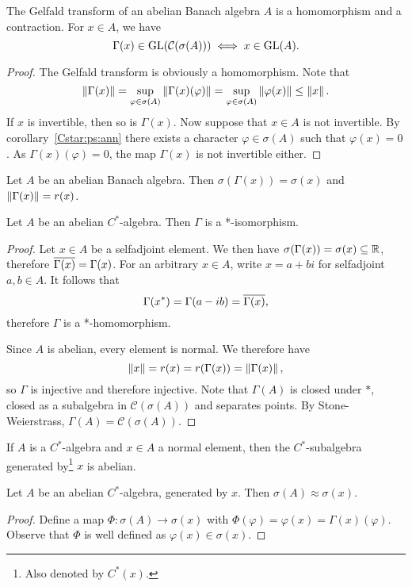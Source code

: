 \begin{izrek}
The Gelfald transform of an abelian Banach algebra $A$ is a
homomorphism and a contraction. For $x \in A$, we have
\[
\Gamma(x) \in \operatorname{GL}(\mathcal{C}(\sigma(A))) \iff x \in \operatorname{GL}(A).
\]
\end{izrek}

\begin{proof}
The Gelfald transform is obviously a homomorphism. Note that
\[
\left\lVert \Gamma(x)\right\rVert =
\sup_{\varphi \in \sigma(A)} \left\lVert \Gamma(x)(\varphi)\right\rVert =
\sup_{\varphi \in \sigma(A)} \left\lVert \varphi(x)\right\rVert \leq
\left\lVert x\right\rVert.
\]
If $x$ is invertible, then so is $\Gamma(x)$. Now suppose that
$x \in A$ is not invertible. By corollary~\ref{Cstar:ps:ann} there
exists a character $\varphi \in \sigma(A)$ such that
$\varphi(x) = 0$. As $\Gamma(x)(\varphi) = 0$, the map $\Gamma(x)$
is not invertible either.
\end{proof}

\begin{posledica}
Let $A$ be an abelian Banach algebra. Then
$\sigma(\Gamma(x)) = \sigma(x)$ and $\left\lVert \Gamma(x)\right\rVert = r(x)$.
\end{posledica}

\begin{izrek}[Gelfald]
Let $A$ be an abelian $C^*$-algebra. Then $\Gamma$ is a
*-isomorphism.
\end{izrek}

\begin{proof}
Let $x \in A$ be a selfadjoint element. We then have
$\sigma(\Gamma(x)) = \sigma(x) \subseteq \mathbb{R}$, therefore
$\overline{\Gamma(x)} = \Gamma(x)$. For an arbitrary $x \in A$, write
$x = a + bi$ for selfadjoint $a, b \in A$. It follows that
\[
\Gamma(x^*) = \Gamma(a - ib) = \overline{\Gamma(x)},
\]
therefore $\Gamma$ is a *-homomorphism.

Since $A$ is abelian, every element is normal. We therefore have
\[
\left\lVert x\right\rVert = r(x) = r(\Gamma(x)) = \left\lVert \Gamma(x)\right\rVert,
\]
so $\Gamma$ is injective and therefore injective. Note that
$\Gamma(A)$ is closed under $*$, closed as a subalgebra in
$\mathcal{C}(\sigma(A))$ and separates points. By
Stone-Weierstrass, $\Gamma(A) = \mathcal{C}(\sigma(A))$.
\end{proof}

\begin{opomba}
If $A$ is a $C^*$-algebra and $x \in A$ a normal element, then the
$C^*$-subalgebra generated by\footnote{Also denoted by $C^*(x)$.}
$x$ is abelian.
\end{opomba}

\begin{posledica}
Let $A$ be an abelian $C^*$-algebra, generated by $x$. Then
$\sigma(A) \approx \sigma(x)$.
\end{posledica}

\begin{proof}
Define a map $\Phi \colon \sigma(A) \to \sigma(x)$ with
$\Phi(\varphi) = \varphi(x) = \Gamma(x)(\varphi)$. Observe that
$\Phi$ is well defined as $\varphi(x) \in \sigma(x)$.
\end{proof}
